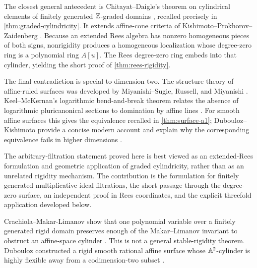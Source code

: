 \begin{historicalnote}\label{hist:graded-cylindricity}
The closest general antecedent is Chitayat--Daigle's theorem on cylindrical elements of finitely generated $\mathbb Z$-graded domains \cite{ChitayatDaigle2024}, recalled precisely in \cref{thm:graded-cylindricity}.  It extends affine-cone criteria of Kishimoto--Prokhorov--Zaidenberg \cite{KishimotoProkhorovZaidenberg2013}.  Because an extended Rees algebra has nonzero homogeneous pieces of both signs, nonrigidity produces a homogeneous localization whose degree-zero ring is a polynomial ring $A[u]$.  The Rees degree-zero ring embeds into that cylinder, yielding the short proof of \cref{thm:rees-rigidity}.
\end{historicalnote}

\begin{historicalnote}\label{hist:a1-surfaces}
The final contradiction is special to dimension two.  The structure theory of affine-ruled surfaces was developed by Miyanishi--Sugie, Russell, and Miyanishi \cite{MiyanishiSugie1980,Russell1981,Miyanishi1982}.  Keel--McKernan's logarithmic bend-and-break theorem relates the absence of logarithmic pluricanonical sections to domination by affine lines \cite[Theorem 1.1]{KeelMcKernan1999}.  For smooth affine surfaces this gives the equivalence recalled in \cref{thm:surface-a1}; Dubouloz--Kishimoto provide a concise modern account and explain why the corresponding equivalence fails in higher dimensions \cite[Introduction]{DuboulozKishimoto2015}.
\end{historicalnote}

\begin{observation}\label{obs:rees-position}
The arbitrary-filtration statement proved here is best viewed as an extended-Rees formulation and geometric application of graded cylindricity, rather than as an unrelated rigidity mechanism.  The contribution is the formulation for finitely generated multiplicative ideal filtrations, the short passage through the degree-zero surface, an independent proof in Rees coordinates, and the explicit threefold application developed below.
\end{observation}

\begin{warning}\label{warn:stable-rigidity}
Crachiola--Makar-Limanov show that one polynomial variable over a finitely generated rigid domain preserves enough of the Makar--Limanov invariant to obstruct an affine-space cylinder \cite[Theorem 3.1]{CrachiolaMakarLimanov2008}.  This is not a general stable-rigidity theorem.  Dubouloz constructed a rigid smooth rational affine surface whose $\mathbb A^2$-cylinder is highly flexible away from a codimension-two subset \cite{Dubouloz2015Flexible}.
\end{warning}

